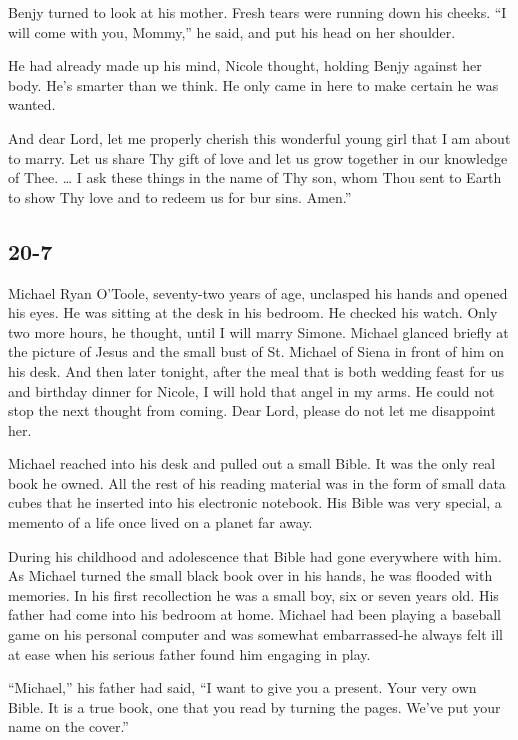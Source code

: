 \documentclass[]{article}
\begin{document}
{Benjy turned to look at his mother.  Fresh tears were running down his cheeks.  “I will come with you, Mommy,” he said, and put his head on her shoulder.

He had already made up his mind, Nicole thought, holding Benjy against her body.  He’s smarter than we think.  He only came in here to make certain he was wanted.

And dear Lord, let me properly cherish this wonderful young girl that I am about to marry.  Let us share Thy gift of love and let us grow together in our knowledge of Thee.  … I ask these things in the name of Thy son, whom Thou sent to Earth to show Thy love and to redeem us for bur sins.  Amen.”

\subsection*{20-7}

Michael Ryan O’Toole, seventy-two years of age, unclasped his hands and opened his eyes.  He was sitting at the desk in his bedroom.  He checked his watch.  Only two more hours, he thought, until I will marry Simone.  Michael glanced briefly at the picture of Jesus and the small bust of St.  Michael of Siena in front of him on his desk.  And then later tonight, after the meal that is both wedding feast for us and birthday dinner for Nicole, I will hold that angel in my arms.  He could not stop the next thought from coming.  Dear Lord, please do not let me disappoint her.

Michael reached into his desk and pulled out a small Bible.  It was the only real book he owned.  All the rest of his reading material was in the form of small data cubes that he inserted into his electronic notebook.  His Bible was very special, a memento of a life once lived on a planet far away.

During his childhood and adolescence that Bible had gone everywhere with him.  As Michael turned the small black book over in his hands, he was flooded with memories.  In his first recollection he was a small boy, six or seven years old.  His father had come into his bedroom at home.  Michael had been playing a baseball game on his personal computer and was somewhat embarrassed-he always felt ill at ease when his serious father found him engaging in play.

“Michael,” his father had said, “I want to give you a present.  Your very own Bible.  It is a true book, one that you read by turning the pages.  We’ve put your name on the cover.”

}
\end{document}
